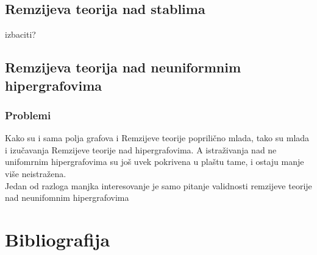 \documentclass[a4paper]{article}
\begin{document}
	\subsection{Remzijeva teorija nad stablima}
	izbaciti?
	\subsection{Remzijeva teorija nad neuniformnim hipergrafovima}\label{neuniformni}
	\subsubsection{Problemi}
	Kako su i sama polja grafova i Remzijeve teorije poprilično mlada, tako su mlada i izučavanja Remzijeve teorije nad hipergrafovima. A istraživanja nad ne unifomrnim hipergrafovima su još uvek pokrivena u plaštu tame, i ostaju manje više neistražena. \\
	Jedan od razloga manjka interesovanje je samo pitanje validnosti remzijeve teorije nad neunifomnim hipergrafovima %
	\section{Bibliografija}	
	\printbibliography
\end{document}
